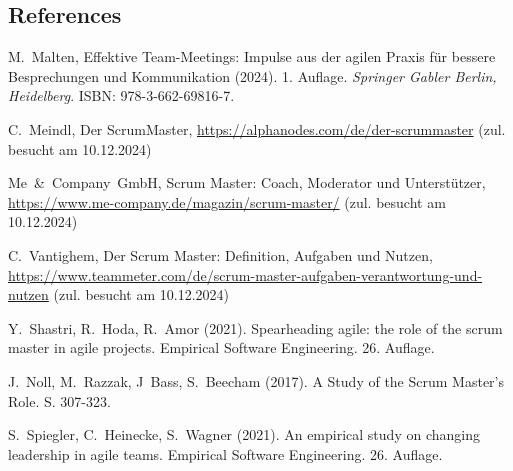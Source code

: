 \documentclass[5pt, final]{beamer}
\begin{document}
\begin{frame}[t]
\begin{multicols}{3}
			
			
			\subsection{References}
						
			\begin{thebibliography}{99}
				
%				
%				
				
				 M.~Malten, Effektive Team-Meetings: Impulse aus der agilen Praxis für bessere Besprechungen und Kommunikation (2024). 1. Auflage. \textit{Springer Gabler Berlin, Heidelberg}. ISBN: 978-3-662-69816-7.
				
				 C.~Meindl, Der ScrumMaster, \url{https://alphanodes.com/de/der-scrummaster} (zul. besucht am 10.12.2024)
				
				 Me~\&~Company~GmbH, Scrum Master: Coach, Moderator und Unterstützer, \url{https://www.me-company.de/magazin/scrum-master/} (zul. besucht am 10.12.2024)
				
				 C.~Vantighem, Der Scrum Master: Definition, Aufgaben und Nutzen, \url{https://www.teammeter.com/de/scrum-master-aufgaben-verantwortung-und-nutzen} (zul. besucht am 10.12.2024)
				
				 Y.~Shastri, R.~Hoda, R.~Amor (2021). Spearheading agile: the role of the scrum master in agile projects. Empirical Software Engineering. 26. Auflage.
				
				 J.~Noll, M.~Razzak, J~Bass, S.~Beecham (2017). A Study of the Scrum Master's Role. S. 307-323.
				
				 S.~Spiegler, C.~Heinecke, S.~Wagner (2021). An empirical study on changing leadership in agile teams. Empirical Software Engineering. 26. Auflage.
				
				

\end{thebibliography}
\end{multicols}
\end{frame}
\end{document}
